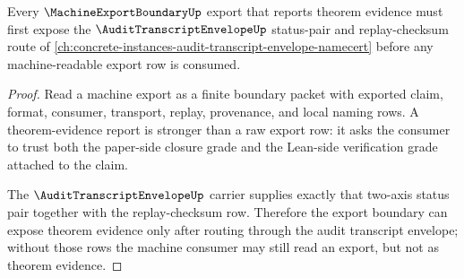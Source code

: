 \begin{theorem}
\label{thm:machine-export-boundary-audit-transcript-envelope-route}
Every $\MachineExportBoundaryUp$ export that reports theorem evidence must first expose the $\AuditTranscriptEnvelopeUp$ status-pair and replay-checksum route of \autoref{ch:concrete-instances-audit-transcript-envelope-namecert} before any machine-readable export row is consumed.
\end{theorem}
\begin{proof}
Read a machine export as a finite boundary packet with exported claim, format, consumer, transport, replay, provenance, and local naming rows. A theorem-evidence report is stronger than a raw export row: it asks the consumer to trust both the paper-side closure grade and the Lean-side verification grade attached to the claim.

The $\AuditTranscriptEnvelopeUp$ carrier supplies exactly that two-axis status pair together with the replay-checksum row. Therefore the export boundary can expose theorem evidence only after routing through the audit transcript envelope; without those rows the machine consumer may still read an export, but not as theorem evidence.
\end{proof}
